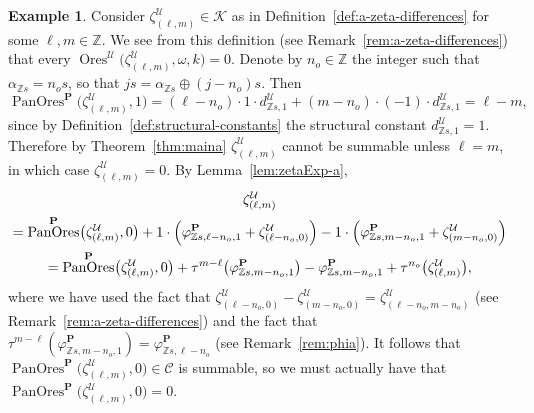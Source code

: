 \documentclass[preprint,12pt]{elsarticle}
\numberwithin{equation}{section} %
\theoremstyle{theorem}
\theoremstyle{definition}
\newtheorem{example}[theorem]{Example}
\newcommand{\Ca}{\mathcal{C}} %
\newcommand{\bk}{\mathcal{K}} %
\newcommand{\idec}{{o}} %
\newcommand{\Z}{\mathbb{Z}} %
\newcommand{\za}[2]{\zeta^{\mathcal{U}}_{( {#1} , {#2} )}}
\DeclareMathOperator{\ores}{Ores}
\DeclareMathOperator{\pano}{PanOres}
\begin{document}
 \begin{example} \label{ex:zeta-difference-a} Consider $\za{\ell}{m}\in\bk$ as in Definition~\ref{def:a-zeta-differences} for some $\ell,m\in\Z$. We see from this definition (see Remark~\ref{rem:a-zeta-differences}) that every $\ores^\mathcal{U}\bigl(\za{\ell}{m},\omega,k)=0$. Denote by $n_\idec\in\Z$ the integer such that $\alpha_{\Z s}=n_\idec s$, so that $js=\alpha_{\Z s}\oplus(j-n_\idec)s$. Then \[\pano^\mathbf{P}\bigl(\za{\ell}{m},1\bigr)=(\ell-n_\idec)\cdot 1\cdot d^\mathcal{U}_{\Z s,1}+(m-n_\idec)\cdot(-1)\cdot d^\mathcal{U}_{\Z s,1}=\ell-m,\] since by Definition~\ref{def:structural-constants} the structural constant $d^\mathcal{U}_{\Z s,1}=1$. Therefore by Theorem~\ref{thm:maina} $\za{\ell}{m}$ cannot be summable unless $\ell=m$, in which case $\za{\ell}{m}=0$. By Lemma~\ref{lem:zetaExp-a}, \begin{multline*}
     \za{\ell}{m}\\ =\pano^\mathbf{P}\bigl(\za{\ell}{m},0\bigr)+1\cdot\Bigl(\varphi^\mathbf{P}_{\Z s,\ell-n_\idec,1}+\za{\ell-n_\idec}{0}\Bigr)-1\cdot\Bigl(\varphi^\mathbf{P}_{\Z s,m-n_\idec,1}+\za{m-n_\idec}{0}\Bigr)\\
     =\pano^\mathbf{P}\bigl(\za{\ell}{m},0\bigr)+\tau^{m-\ell}\bigl(\varphi^\mathbf{P}_{\Z s,m-n_\idec,1}\bigr)-\varphi^\mathbf{P}_{\Z s,m-n_\idec,1}+\tau^{n_\idec}\bigl(\za{\ell}{m}\bigr),
 \end{multline*} where we have used the fact that $\za{\ell-n_\idec}{0}-\za{m-n_\idec}{0}=\za{\ell-n_\idec}{m-n_\idec}$ (see Remark~\ref{rem:a-zeta-differences}) and the fact that $\tau^{m-\ell}(\varphi^\mathbf{P}_{\Z s,m-n_\idec,1})=\varphi^\mathbf{P}_{\Z s,\ell-n_\idec}$ (see Remark~\ref{rem:phia}). It follows that $\pano^\mathbf{P}\bigl(\za{\ell}{m},0)\in\Ca$ is summable, so we must actually have that $\pano^\mathbf{P}\bigl(\za{\ell}{m},0)=0$. \end{example}
\end{document}
